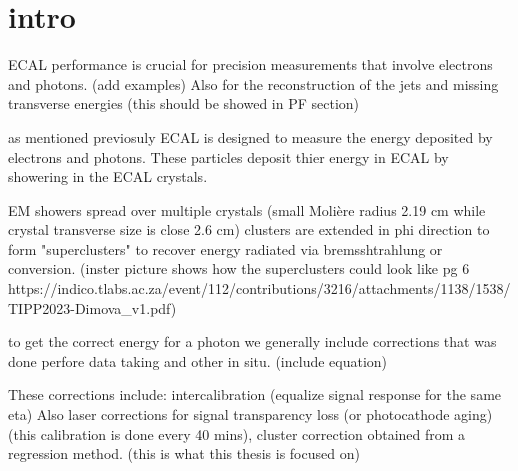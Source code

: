 
\section{intro}

ECAL performance is crucial for	precision measurements that involve electrons and photons. (add examples) 
Also for the reconstruction of the jets	and missing transverse energies	(this should be showed in PF section)

as mentioned previosuly ECAL is designed to measure the energy deposited by electrons and photons. 
These particles deposit thier energy in ECAL by showering in the ECAL crystals.


EM showers spread over multiple crystals (small Molière radius 2.19 cm while crystal transverse size is close 2.6 cm)
clusters are extended in phi direction to form "superclusters" to recover energy radiated via bremsshtrahlung or conversion.
(inster picture shows how the superclusters could look like pg 6 https://indico.tlabs.ac.za/event/112/contributions/3216/attachments/1138/1538/TIPP2023-Dimova_v1.pdf)

to get the correct energy for a photon we generally include corrections that was done perfore data taking and other in situ.
(include equation) 

These corrections include: intercalibration (equalize signal response for the same eta)
Also laser corrections for signal transparency loss (or photocathode aging) (this calibration is done every 40 mins),
cluster correction obtained from a regression method. (this is what this thesis is focused on)


